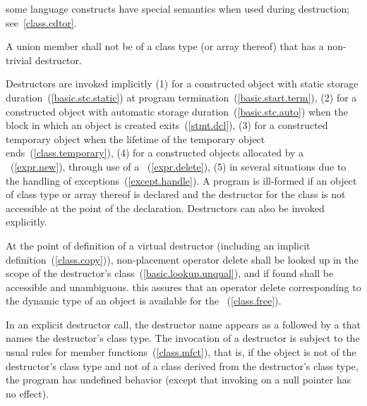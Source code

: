 \pnum
\enternote
{}%
some language constructs have special semantics when used during destruction;
see~\ref{class.cdtor}.
\exitnote

\pnum
A union member shall not be of a class type (or array thereof) that has a
non-trivial destructor.

\pnum
{}%
%
Destructors are invoked implicitly
(1) for a constructed object with static storage duration~(\ref{basic.stc.static}) at program termination~(\ref{basic.start.term}),
(2) for a constructed object with automatic storage duration~(\ref{basic.stc.auto}) when the block in which an object is created exits~(\ref{stmt.dcl}),
(3) for a constructed temporary object when the lifetime
of the temporary object ends~(\ref{class.temporary}),
%
(4) for a constructed objects allocated by a
~(\ref{expr.new}), through use of a
~(\ref{expr.delete}),
(5) in several situations due to the handling of exceptions~(\ref{except.handle}).
A program is ill-formed if an object of class type or array thereof is
declared and the destructor for the class is not accessible at the point
of the declaration.
%
Destructors can also be invoked explicitly.

\pnum
At the point of definition of a virtual destructor (including an implicit
definition~(\ref{class.copy})), non-placement operator delete shall be
looked up in the scope of the destructor's class~(\ref{basic.lookup.unqual}),
and if found shall be accessible and unambiguous.
\enternote
this assures that an operator delete corresponding to the dynamic type of an
object is available for the
~(\ref{class.free}).
\exitnote

\pnum
{}%
In an explicit destructor call, the destructor name appears as a
\tcode{\~{}}
followed by a
that names the destructor's class type.
The invocation of a destructor is subject to the usual rules for member
functions~(\ref{class.mfct}),
that is, if the object is not of the destructor's class type and
not of a class derived from the destructor's class type, the program has
undefined behavior
(except that invoking
on a null pointer has no effect).
\enterexample

